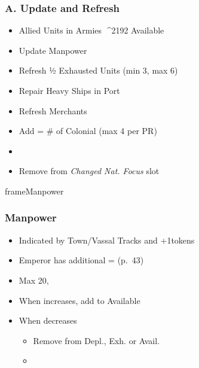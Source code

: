 \documentclass[10pt]{article}
\newlength{\fhManpower} \setlength\fhManpower{9\baselineskip}
\begin{document}
\subsubsection*{A. Update and Refresh}
\begin{itemize}
	\item Allied Units in Armies ^^^^2192 Available \manpower
	\item {}Update Manpower
	\item Refresh ½ Exhausted Units (min 3, max 6)
	\item Repair Heavy Ships in Port
	\item Refresh Merchants
	\item Add \colonists = \# of Colonial \claims (max 4 per PR)
	\item {}
	\item Remove \cube from \emph{Changed Nat. Focus} slot
\end{itemize}
\begin{dynamiccontents*}{frameManpower}\begin{eubox}{\fhManpower}
	\subsubsection*{Manpower }
	\begin{itemize}
		\item Indicated by Town/Vassal Tracks and +1\manpower tokens
		\item Emperor has additional \manpower = \authority (p.~43)
		\item Max 20, 
		\item When increases, add to Available \manpower
		\item When decreases
		\begin{itemize}
			\item Remove from Depl., Exh. or Avail. \manpower
			\item {}
		\end{itemize}
	\end{itemize}
\end{eubox}\end{dynamiccontents*}
\end{document}

